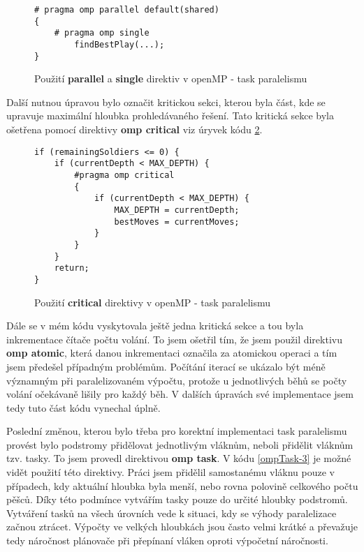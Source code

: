 \documentclass{article} \oddsidemargin=-5mm
\begin{document}
\begin{figure}[h]
\centering
\begin{BVerbatim}
# pragma omp parallel default(shared)
{
    # pragma omp single
        findBestPlay(...);
}
\end{BVerbatim}
\caption{Použití \textbf{parallel} a \textbf{single} direktiv v openMP - task paralelismu}
\label{ompTask-1}
\end{figure}

Další nutnou úpravou bylo označit kritickou sekci, kterou byla část, kde se upravuje maximální hloubka prohledávaného řešení. Tato kritická sekce byla ošetřena pomocí direktivy \textbf{omp critical} viz úryvek kódu \ref{ompTask-2}.

\begin{figure}[h]
\centering
\begin{BVerbatim}
if (remainingSoldiers <= 0) {
    if (currentDepth < MAX_DEPTH) {
        #pragma omp critical
        {
            if (currentDepth < MAX_DEPTH) {
                MAX_DEPTH = currentDepth;
                bestMoves = currentMoves;
            }
        }
    }
    return;
}
\end{BVerbatim}
\caption{Použití \textbf{critical} direktivy v openMP - task paralelismu}
\label{ompTask-2}
\end{figure}

Dále se v mém kódu vyskytovala ještě jedna kritická sekce a tou byla inkrementace čítače počtu volání. To jsem ošetřil tím, že jsem použil direktivu \textbf{omp atomic}, která danou inkrementaci označila za atomickou operaci a tím jsem předešel případným problémům. Počítání iterací se ukázalo být méně významným při paralelizovaném výpočtu, protože u jednotlivých běhů se počty volání očekávaně lišily pro každý běh. V dalších úpravách své implementace jsem tedy tuto část kódu vynechal úplně.

Poslední změnou, kterou bylo třeba pro korektní implementaci task paralelismu provést bylo podstromy přidělovat jednotlivým vláknům, neboli přidělit vláknům tzv. tasky. To jsem provedl direktivou \textbf{omp task}. V kódu \ref{ompTask-3} je možné vidět použití této direktivy. Práci jsem přidělil samostanému vláknu pouze v případech, kdy aktuální hloubka byla menší, nebo rovna polovině celkového počtu pěšců. Díky této podmínce vytvářím tasky pouze do určité hloubky podstromů. Vytváření tasků na všech úrovních vede k situaci, kdy se výhody paralelizace začnou ztrácet. Výpočty ve velkých hloubkách jsou často velmi krátké a převažuje tedy náročnost plánovače při přepínaní vláken oproti výpočetní náročnosti.
\end{document}
